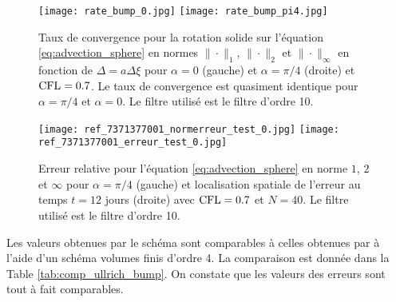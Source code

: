 \begin{figure}[htbp]
\begin{center}
\texttt{[image: rate\_bump\_0.jpg]}
\texttt{[image: rate\_bump\_pi4.jpg]}
\end{center}
\caption{Taux de convergence pour la rotation solide sur l'équation \eqref{eq:advection_sphere} en normes $\| \cdot\|_1$, $\| \cdot\|_2$ et $\| \cdot\|_{\infty}$ en fonction de $\Delta = a \Delta \xi$ pour $\alpha = 0$ (gauche) et $\alpha = \pi / 4$ (droite) et $\text{CFL} = 0.7$. Le taux de convergence est quasiment identique pour $\alpha = \pi/4$ et $\alpha=0$. Le filtre utilisé est le filtre d'ordre 10.}
\label{fig:rate_bump}
\end{figure}

\begin{figure}[htbp]
\begin{center}
\texttt{[image: ref\_7371377001\_normerreur\_test\_0.jpg]}
\texttt{[image: ref\_7371377001\_erreur\_test\_0.jpg]}
\end{center}
\caption{Erreur relative pour l'équation \eqref{eq:advection_sphere} en norme $1$, $2$ et $\infty$ pour $\alpha = \pi/4$ (gauche) et localisation spatiale de l'erreur au temps $t=12$ jours (droite) avec $\text{CFL} = 0.7$ et $N=40$. Le filtre utilisé est le filtre d'ordre 10.}
\label{fig:erreur_bump}
\end{figure}

Les valeurs obtenues par le schéma sont comparables à celles obtenues par \cite{Ullrich2010, Ullrich2011} à l'aide d'un schéma volumes finis d'ordre 4. La comparaison est donnée dans la Table \ref{tab:comp_ullrich_bump}. On constate que les valeurs des erreurs sont tout à fait comparables.

